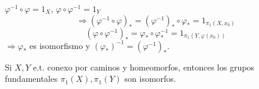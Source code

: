 \begin{dem}
  $\varphi^{-1} \circ \varphi = 1_{X}$, $\varphi \circ \varphi^{-1} = 1_{Y}$
  \[ 
    \Rightarrow (\varphi^{-1} \circ \varphi)_* = (\varphi^{-1})_* \circ \varphi_* = 1_{\pi_{1}(X, x_{0})}  
  \] 
  \[ 
    (\varphi \circ \varphi^{-1})_* = \varphi_* \circ \varphi^{-1}_* = 1_{\pi_{1}(Y, \varphi(x_{0}))}
  \] 
  $\Rightarrow \varphi_*$ es isomorfismo y $(\varphi_*)^{-1} = (\varphi^{-1})_*$.
\end{dem}

\begin{cor}
  Si $X, Y$ e.t. conexo por caminos y homeomorfos, entonces los grupos fundamentales $\pi_{1}(X), \pi_{1}(Y)$ son isomorfos.
\end{cor}
